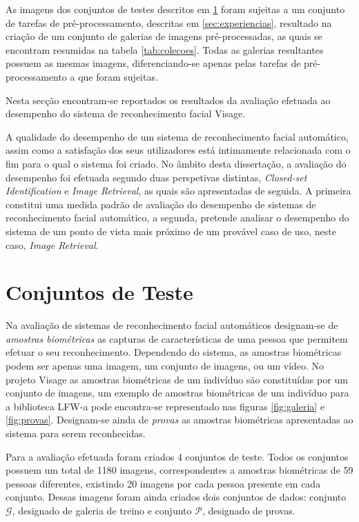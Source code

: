 As imagens dos conjuntos de testes descritos em \ref{sec:conjuntos} foram sujeitas a um conjunto de tarefas de pré-processamento, descritas em \ref{sec:experiencias}, resultado na criação de um conjunto de galerias de imagens pré-processadas, as quais se encontram resumidas na tabela \ref{tab:colecoes}. Todas as galerias resultantes possuem as mesmas imagens, diferenciando-se apenas pelas tarefas de pré-processamento a que foram sujeitas.

Nesta secção encontram-se reportados os resultados da avaliação efetuada ao desempenho do sistema de reconhecimento facial Visage.

A qualidade do desempenho de um sistema de reconhecimento facial automático, assim como a satisfação dos seus utilizadores está intimamente relacionada com o fim para o qual o sistema foi criado. No âmbito desta dissertação, a avaliação do desempenho foi efetuada segundo duas perspetivas distintas, \textit{Closed-set Identification} e \textit{Image Retrieval}, as quais são apresentadas de seguida. A primeira constitui uma medida padrão de avaliação do desempenho de sistemas de reconhecimento facial automático, a segunda, pretende analisar o desempenho do sistema de um ponto de vista mais próximo de um provável caso de uso, neste caso, \textit{Image Retrieval}.


\section{Conjuntos de Teste}  \label{sec:conjuntos}

Na avaliação de sistemas de reconhecimento facial automáticos designam-se de \textit{amostras biométricas} as capturas de características de uma pessoa que permitem efetuar o seu reconhecimento. Dependendo do sistema, as amostras biométricas podem ser apenas uma imagem, um conjunto de imagens, ou um vídeo. No projeto Visage as amostras biométricas de um indivíduo são constituídas por um conjunto de imagens, um exemplo de amostras biométricas de um indivíduo para a biblioteca LFW-a pode encontra-se representado nas figuras \ref{fig:galeria}  e \ref{fig:provas}. Designam-se ainda de \textit{provas} as amostras biométricas apresentadas ao sistema para serem reconhecidas.

Para a avaliação efetuada foram criados 4 conjuntos de teste. Todos os conjuntos possuem um total de 1180 imagens, correspondentes a amostras biométricas de 59 pessoas diferentes, existindo 20 imagens por cada pessoa presente em cada conjunto. Dessas imagens foram ainda criados dois conjuntos de dados: conjunto $\mathscr{G}$, designado de galeria de treino e conjunto $\mathscr{P}$, designado de provas.

